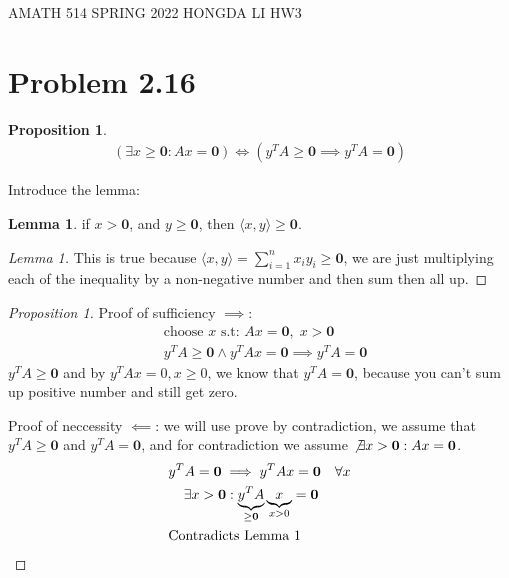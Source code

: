 \documentclass[]{article}
\theoremstyle{definition}
\newtheorem{prop}{Proposition}
\newtheorem{lemma}{Lemma}
\begin{document}
\begin{center}
    AMATH 514 SPRING 2022 HONGDA LI HW3
\end{center}
\section{Problem 2.16}
    \begin{prop}
        \begin{align}
            (\exists x \ge \mathbf 0: Ax = \mathbf 0 )
            \iff 
            (y^TA \ge \mathbf 0 \implies y^TA = \mathbf 0)
        \end{align}
    \end{prop}
    \noindent
    Introduce the lemma: 
    \begin{lemma}
        if $x >\mathbf 0$, and $y\ge \mathbf 0$, then $\langle x, y\rangle \ge \mathbf 0$. 
    \end{lemma}
    \begin{proof}[Lemma 1]
        This is true because $\langle x, y\rangle = \sum_{i = 1}^{n}x_i y_i \ge \mathbf 0$, we are just multiplying each of the inequality by a non-negative number and then sum then all up. 
    \end{proof}
    \begin{proof}[Proposition 1]
        Proof of sufficiency $\implies$: 
        \begin{align}
            &\text{choose }x \text{ s.t: } Ax = \mathbf 0 ,\; x > \mathbf 0
            \\
            & y^TA \ge\mathbf 0 \wedge y^TAx = \mathbf 0 \implies y^TA = \mathbf 0
        \end{align}
        $y^TA \ge \mathbf 0$ and by $y^TAx = 0, x\ge 0$, we know that $y^TA = \mathbf 0$, because you can't sum up positive number and still get zero. 
        \par
        Proof of neccessity $\impliedby$: we will use prove by contradiction, we assume that $y^TA\ge \mathbf 0$ and $y^TA = \mathbf 0$, and for contradiction we assume $\not\exists x > \mathbf 0: Ax = \mathbf 0$. 
        \begin{align}
            & y^TA = \mathbf 0 \implies y^TAx = \mathbf 0 \quad \forall x
            \\
            &\hspace{1.1em}
            \exists x > \mathbf 0: \underbrace{y^TA}_{\ge \mathbf 0} \underbrace{x}_{x > 0} = \mathbf 0
            \\
            & \text{Contradicts Lemma 1}
        \end{align}

    \end{proof}
\end{document}
